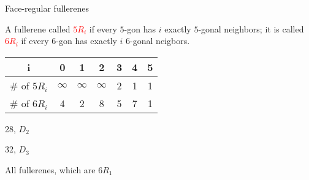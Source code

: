 \documentclass[%
pdf,
colorBG,
slideColor,
]{prosper}
\begin{document}
\begin{slide}{Face-regular fullerenes}

A fullerene called \textcolor{red}{$5R_i$} if every $5$-gon has $i$ 
exactly $5$-gonal 
neighbors; it is called \textcolor{red}{$6R_i$} if every $6$-gon has
exactly $i$ $6$-gonal neigbors.

\begin{center}
\begin{tabular}{|c|c|c|c|c|c|c|}
\hline
i             &0        &1        &2        &3  & 4  &     5\\
\hline
\# of $5R_i$  &$\infty$ &$\infty$ &$\infty$ &2  & 1  &     1\\
\hline
\# of $6R_i$  &4        &2        &8        &5  & 7  &     1\\
\hline
\end{tabular}
\end{center}

\begin{center}
\begin{minipage}{5cm}
\centering
{}\par
28, $D_2$
\end{minipage}
\begin{minipage}{5cm}
\centering
{}\par
32, $D_3$
\end{minipage}
\end{center}
\begin{center}
All fullerenes, which are $6R_1$
\end{center}


\end{slide}
\end{document}

